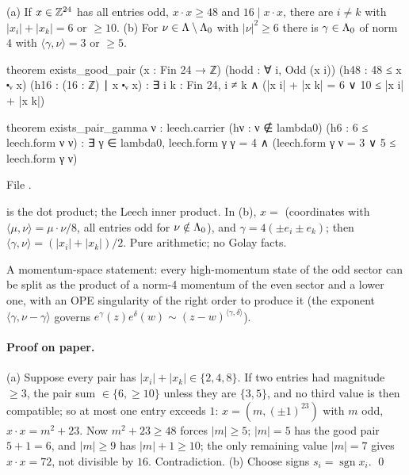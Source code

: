 \begin{theorem}\label{ch14:thm:pair}
(a) If $x\in{\mathbb{Z}}^{24}$ has all entries odd, $x\cdot x\ge48$ and $16\mid x\cdot x$, there are $i\ne k$ with
$|x_i|+|x_k|=6$ or $\ge10$.  (b) For $\nu\in{\Lambda}\setminus{\Lambda}_0$ with $|\nu|^2\ge6$ there is $\gamma\in{\Lambda}_0$
of norm $4$ with $\langle\gamma,\nu\rangle=3$ or $\ge5$.
\end{theorem}
\begin{leancode}
theorem exists_good_pair (x : Fin 24 → ℤ) (hodd : ∀ i, Odd (x i)) (h48 : 48 ≤ x ⬝ᵥ x)
    (h16 : (16 : ℤ) ∣ x ⬝ᵥ x) :
    ∃ i k : Fin 24, i ≠ k ∧ (|x i| + |x k| = 6 ∨ 10 ≤ |x i| + |x k|)

theorem exists_pair_gamma {ν : leech.carrier} (hν : ν ∉ lambda0) (h6 : 6 ≤ leech.form ν ν) :
    ∃ γ ∈ lambda0, leech.form γ γ = 4 ∧ (leech.form γ ν = 3 ∨ 5 ≤ leech.form γ ν)
\end{leancode}
File .

\begin{dictionary}
 is the dot product;  the Leech inner product.  In (b), $x=$ 
(coordinates with $\langle\mu,\nu\rangle=\mu\cdot\nu/8$, all entries odd for $\nu\notin{\Lambda}_0$), and
$\gamma=4(\pm e_i\pm e_k)$; then $\langle\gamma,\nu\rangle=(|x_i|+|x_k|)/2$.  Pure arithmetic; no Golay facts.
\end{dictionary}

\begin{physics}
A momentum-space statement: every high-momentum state of the odd sector can be split as the
product of a norm-4 momentum of the even sector and a lower one, with an OPE singularity of the right
order to produce it (the exponent $\langle\gamma,\nu-\gamma\rangle$ governs $e^\gamma(z)e^{\delta}(w)\sim(z-w)^{\langle\gamma,\delta\rangle}$).
\end{physics}

\paragraph{Proof on paper.}  (a) Suppose every pair has $|x_i|+|x_k|\in\{2,4,8\}$.  If two entries
had magnitude $\ge3$, the pair sum $\in\{6,\ge10\}$ unless they are $\{3,5\}$, and no third value is then
compatible; so at most one entry exceeds $1$: $x=(m,(\pm1)^{23})$ with $m$ odd, $x\cdot x=m^2+23$.  Now $m^2+23\ge48$ forces $|m|\ge5$; $|m|=5$ has the
good pair $5+1=6$, and $|m|\ge9$ has $|m|+1\ge10$; the only remaining value $|m|=7$ gives $x\cdot x=72$,
not divisible by $16$.  Contradiction.  (b) Choose signs $s_i=\operatorname{sgn}x_i$. \qed


